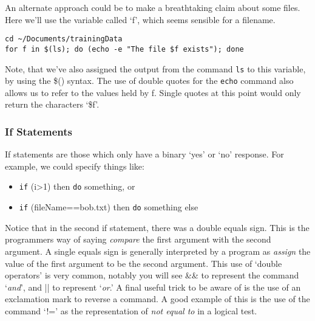 \begin{advanced}
An alternate approach could be to make a breathtaking claim about some files.
Here we'll use the variable called `f', which seems sensible for a filename.
\begin{lstlisting}
cd ~/Documents/trainingData
for f in $(ls); do (echo -e "The file $f exists"); done
\end{lstlisting}
\end{advanced}

Note, that we've also assigned the output from the command \texttt{ls} to this variable, by using the \$() syntax.
The use of double quotes for the \texttt{echo} command also allows us to refer to the values held by f.
Single quotes at this point would only return the characters `\$f'.

\subsubsection{If Statements}
If statements are those which only have a binary `yes' or `no' response.
For example, we could specify things like:
\begin{itemize}
\item \texttt{if} (i>1) then \texttt{do} something, or
\item \texttt{if} (fileName==bob.txt) then \texttt{do} something else
\end{itemize}

\begin{information}
Notice that in the second if statement, there was a double equals sign.
This is the programmers way of saying \textit{compare} the first argument with the second argument.
A single equals sign is generally interpreted by a program as \textit{assign} the value of the first argument to be the second argument.
This use of `double operators' is very common, notably you will see \&\& to represent the command `\textit{and}', and || to represent `\textit{or}.'
A final useful trick to be aware of is the use of an exclamation mark to reverse a command.
A good example of this is the use of the command `!=' as the representation of \textit{not equal to} in a logical test.
\end{information}


